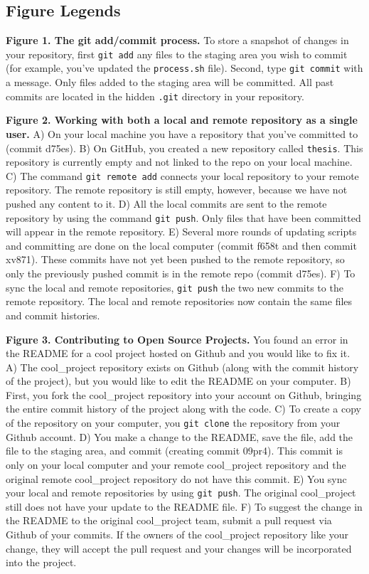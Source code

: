 \subsection{Figure Legends}

\textbf{Figure 1. The git add/commit process.}
To store a snapshot of changes in your repository, first \verb|git add| any files to the staging area you wish to commit (for example, you've updated the \verb|process.sh| file).
Second, type \verb|git commit| with a message. Only files added to the staging area will be committed.
All past commits are located in the hidden \verb|.git| directory in your repository.

\textbf{Figure 2. Working with both a local and remote repository as a single user.}
A) On your local machine you have a repository that you've committed to (commit d75es).
B) On GitHub, you created a new repository called \verb|thesis|. This repository is currently empty and not linked to the repo on your local machine.
C) The command \verb|git remote add| connects your local repository to your remote repository.
The remote repository is still empty, however, because we have not pushed any content to it.
D) All the local commits are sent to the remote repository by using the command \verb|git push|.
Only files that have been committed will appear in the remote repository.
E) Several more rounds of updating scripts and committing are done on the local computer (commit f658t and then commit xv871).
These commits have not yet been pushed to the remote repository, so only the previously pushed commit is in the remote repo (commit d75es).
F) To sync the local and remote repositories, \verb|git push| the two new commits to the remote repository.
The local and remote repositories now contain the same files and commit histories.

\textbf{Figure 3. Contributing to Open Source Projects.}
You found an error in the README for a cool project hosted on Github and you would like to fix it.
A) The cool\_project repository exists on Github (along with the commit history of the project), but you would like to edit the README on your computer.
B) First, you fork the cool\_project repository into your account on Github, bringing the entire commit history of the project along with the code.
C) To create a copy of the repository on your computer, you \verb|git clone| the repository from your Github account.
D) You make a change to the README, save the file, add the file to the staging area, and commit (creating commit 09pr4).
This commit is only on your local computer and your remote cool\_project repository and the original remote cool\_project repository do not have this commit.
E) You sync your local and remote repositories by using \verb|git push|.
The original cool\_project still does not have your update to the README file.
F) To suggest the change in the README to the original cool\_project team, submit a pull request via Github of your commits.
If the owners of the cool\_project repository like your change, they will accept the pull request and your changes will be incorporated into the project.

